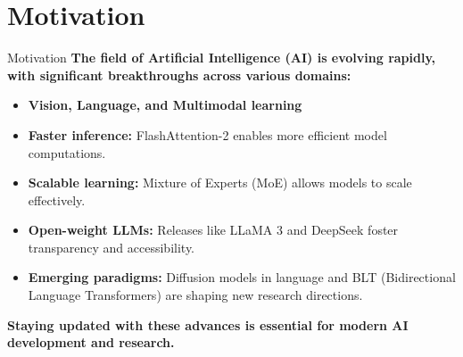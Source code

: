 \section{Motivation}
\begin{frame}[allowframebreaks]{Motivation}
\noindent
\textbf{The field of Artificial Intelligence (AI) is evolving rapidly, with significant breakthroughs across various domains:}
\vspace{0.5em}

\begin{itemize}
    \item \textbf{Vision, Language, and Multimodal learning}
    \item \textbf{Faster inference:} FlashAttention-2 enables more efficient model computations.
    \item \textbf{Scalable learning:} Mixture of Experts (MoE) allows models to scale effectively.
    \item \textbf{Open-weight LLMs:} Releases like LLaMA 3 and DeepSeek foster transparency and accessibility.
    \item \textbf{Emerging paradigms:} Diffusion models in language and BLT (Bidirectional Language Transformers) are shaping new research directions.
\end{itemize}

\vspace{0.5em}
\noindent
\textbf{Staying updated with these advances is essential for modern AI development and research.}
\end{frame}
